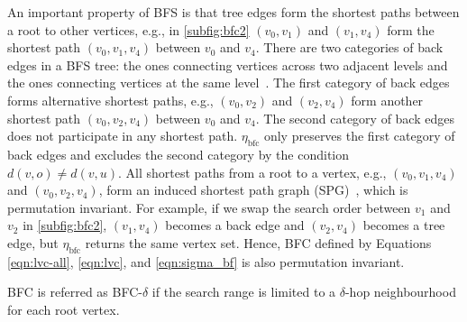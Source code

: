 An important property of BFS is that tree edges form the shortest paths between a root to other vertices, e.g., in \cref{subfig:bfc2} $(v_0,v_1)$ and $(v_1,v_4)$ form the shortest path $(v_0,v_1,v_4)$ between $v_0$ and $v_4$. 
There are two categories of back edges in a BFS tree: the ones connecting vertices across two adjacent levels and the ones connecting vertices at the same level~\citep{Cormen_algointro}. The first category of back edges forms alternative shortest paths, e.g., $(v_0,v_2)$ and $(v_2,v_4)$ form another shortest path $(v_0,v_2,v_4)$ between $v_0$ and $v_4$. The second category of back edges does not participate in any shortest path. %
$\eta_{\text{bfc}}$ only preserves the first category of back edges and excludes the second category by the condition $d(v,o) \neq d(v,u)$. 
All shortest paths from a root to a vertex, e.g., $(v_0,v_1, v_4)$ and $(v_0,v_2,v_4)$, form an induced shortest path graph (SPG)~\citep{Wang2021-shortestpathgraph}, which is permutation invariant. For example, if we swap the search order between $v_1$ and $v_2$ in \cref{subfig:bfc2}, $(v_1,v_4)$ becomes a back edge and $(v_2,v_4)$ becomes a tree edge, but $\eta_{\text{bfc}}$ returns the same vertex set. Hence, BFC defined by Equations \ref{eqn:lvc-all}, \ref{eqn:lvc}, and \ref{eqn:sigma_bf} is also permutation invariant. 

BFC is referred as BFC-$\delta$ if the search range is limited to a $\delta$-hop neighbourhood for each root vertex. 




